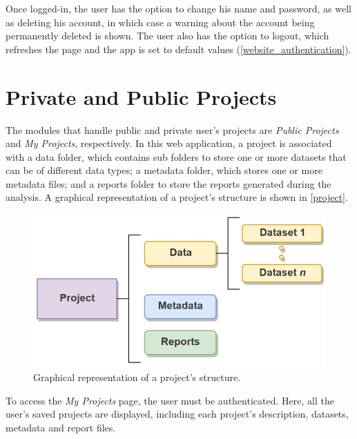 Once logged-in, the user has the option to change his name and password, as well as deleting his account, in which case a warning about the account being permanently deleted is shown. The user also has the option to logout, which refreshes the page and the app is set to default values (\autoref{website_authentication}).


%	



\section{Private and Public Projects}

The modules that handle public and private user's projects are \textit{Public Projects} and \textit{My Projects}, respectively. In this web application, a project is associated with a data folder, which contains sub folders to store one or more datasets that can be of different data types; a metadata folder, which stores one or more metadata files; and a reports folder to store the reports generated during the analysis. A graphical representation of a project's structure is shown in \autoref{project}.

\begin{figure}[h]
	\centering
	\includegraphics[width=0.5\linewidth]{Imagens/project}
	\caption{Graphical representation of a project's structure.}
	\label{project}
\end{figure}

To access the \textit{My Projects} page, the user must be authenticated. Here, all the user's saved projects are displayed, including each project's description, datasets, metadata and report files. 

